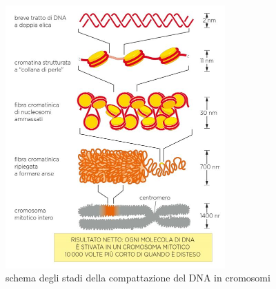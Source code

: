             \begin{figure}[h]
                \centering
                \includegraphics[width=0.75\textwidth]{images/compattazioneDNA.JPG}
                \caption{\small schema degli stadi della compattazione del DNA in cromosomi}
                \label{fig:mesh1}
            \end{figure}
        
